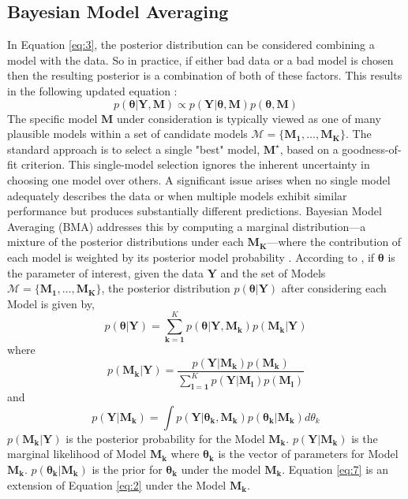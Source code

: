 \documentclass[12 pt]{scrartcl}
\begin{document}
	\subsection{Bayesian Model Averaging}
	In Equation \ref{eq:3}, the posterior distribution can be considered combining a model with the data. So in practice, if either bad data or a bad model is chosen then the resulting posterior is a combination of both of these factors. This results in the following updated equation \cite[1.1]{BMCP2021}:
	\begin{equation}
		p(\boldsymbol{\theta}|\boldsymbol{Y},\boldsymbol{M}) \propto p(\boldsymbol{Y}|\boldsymbol{\theta},\boldsymbol{M}) p(\boldsymbol{\theta},\boldsymbol{M})
		\label{eq:4}
	\end{equation}
	The specific model $\boldsymbol{M}$ under consideration is typically viewed as one of many plausible models within a set of candidate models $\mathcal{M} = \boldsymbol{\{M_1, \ldots, M_K}\}$. The standard approach is to select a single "best" model, $\boldsymbol{M^\star}$, based on a goodness-of-fit criterion. This single-model selection ignores the inherent uncertainty in choosing one model over others. A significant issue arises when no single model adequately describes the data or when multiple models exhibit similar performance but produces substantially different predictions. Bayesian Model Averaging (BMA) addresses this by computing a marginal distribution—a mixture of the posterior distributions under each $\boldsymbol{M_K}$—where the contribution of each model is weighted by its posterior model probability \cite[p. 383-384]{BMA-Hoeting}. According to \citep{BMA-Hoeting}, if $\boldsymbol{\theta}$ is the parameter of interest, given the data $\boldsymbol{Y}$ and the set of Models $\mathcal{M} = \boldsymbol{\{M_1, \ldots, M_K}\}$, the posterior distribution $p(\boldsymbol{\theta}|\boldsymbol{Y})$ after considering each Model is given by,
	\begin{equation}
		p(\boldsymbol{\theta}|\boldsymbol{Y}) = \sum_{\boldsymbol{k=1}}^{K} p(\boldsymbol{\theta}|\boldsymbol{Y},\boldsymbol{M_k}) p(\boldsymbol{M_k}|\boldsymbol{Y})
		\label{eq:5}
	\end{equation}
	where
	\begin{equation}
		p(\boldsymbol{M_k|Y})=\frac{p(\boldsymbol{Y|M_k})p(\boldsymbol{M_k})}{\sum_{\boldsymbol{l=1}}^{K}p(\boldsymbol{Y|M_l})p(\boldsymbol{M_l})}
		\label{eq:6}
	\end{equation}
	and
	\begin{equation}
		p(\boldsymbol{Y|M_k}) = \int p(\boldsymbol{Y|\theta_k, M_k})p(\boldsymbol{\theta_k|M_k})d\theta_k
		\label{eq:7}
	\end{equation}
	$p(\boldsymbol{M_k|Y})$ is the posterior probability for the Model $\boldsymbol{M_k}$. $p(\boldsymbol{Y|M_k})$ is the marginal likelihood of  Model $\boldsymbol{M_k}$ where $\boldsymbol{\theta_k}$ is the vector of parameters for  Model $\boldsymbol{M_k}$. $p(\boldsymbol{\theta_k|M_k})$ is the prior for $\boldsymbol{\theta_k}$ under the model $\boldsymbol{M_k}$. Equation \ref{eq:7} is an extension of Equation \ref{eq:2} under the Model $\boldsymbol{M_k}$. 
	
\end{document}
